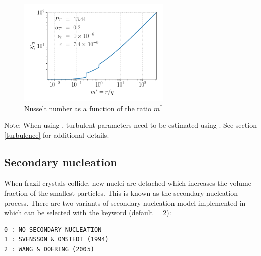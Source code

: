 \begin{enumerate}
\begin{figure}[H]
  \centering
  \includegraphics[width=0.65\textwidth]{graphics/figure_nusselt.pdf}
  \caption{Nusselt number as a function of the ratio $m^{*}$}
  \label{fig:nusselt}
\end{figure}
\end{enumerate}

\begin{WarningBlock}{Note:}
    When using , turbulent parameters need to be estimated using
    . See section \ref{turbulence} for additional details.
\end{WarningBlock}

\subsection{Secondary nucleation}
\label{section:secondary_nucleation}

When frazil crystals collide, new nuclei are detached
which increases the volume fraction of the smallest particles.
This is known as the secondary nucleation process.
There are two variants of secondary nucleation model implemented in \khione
which can be selected with the keyword  (default = 2):
\begin{lstlisting}
0 : NO SECONDARY NUCLEATION
1 : SVENSSON & OMSTEDT (1994)
2 : WANG & DOERING (2005)
\end{lstlisting}

